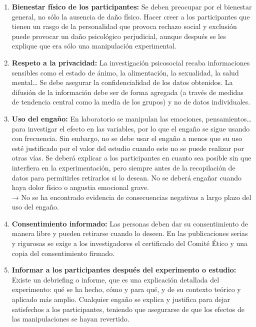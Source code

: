 \documentclass[
]{website}
\providecommand{\tightlist}{%
  \setlength{\itemsep}{0pt}\setlength{\parskip}{0pt}}
\begin{document}
\begin{enumerate}
\def\labelenumi{\arabic{enumi}.}
\tightlist
\item
  \textbf{Bienestar físico de los participantes:} Se deben preocupar por el bienestar general, no sólo la ausencia de daño físico. Hacer creer a los participantes que tienen un rasgo de la personalidad que provoca rechazo social y exclusión puede provocar un daño psicológico perjudicial, aunque después se les explique que era sólo una manipulación experimental.
\item
  \textbf{Respeto a la privacidad:} La investigación psicosocial recaba informaciones sensibles como el estado de ánimo, la alimentación, la sexualidad, la salud mental\ldots{} Se debe asegurar la confidencialidad de los datos obtenidos. La difusión de la información debe ser de forma agregada (a través de medidas de tendencia central como la media de los grupos) y no de datos individuales.
\item
  \textbf{Uso del engaño:} En laboratorio se manipulan las emociones, pensamientos\ldots{} para investigar el efecto en las variables, por lo que el engaño se sigue usando con frecuencia. Sin embargo, no se debe usar el engaño a menos que su uso esté justificado por el valor del estudio cuando este no se puede realizar por otras vías. Se deberá explicar a los participantes en cuanto sea posible sin que interfiera en la experimentación, pero siempre antes de la recopilación de datos para permitirles retirarlos si lo desean. No se deberá engañar cuando haya dolor físico o angustia emocional grave.\\
  → No se ha encontrado evidencia de consecuencias negativas a largo plazo del uso del engaño.
\item
  \textbf{Consentimiento informado:} Las personas deben dar su consentimiento de manera libre y pueden retirarse cuando lo deseen. En las publicaciones serias y rigurosas se exige a los investigadores el certificado del Comité Ético y una copia del consentimiento firmado.
\item
  \textbf{Informar a los participantes después del experimento o estudio:} Existe un debriefing o informe, que es una explicación detallada del experimento: qué se ha hecho, cómo y para qué, y de su contexto teórico y aplicado más amplio. Cualquier engaño se explica y justifica para dejar satisfechos a los participantes, teniendo que asegurarse de que los efectos de las manipulaciones se hayan revertido.
\end{enumerate}
\end{document}
